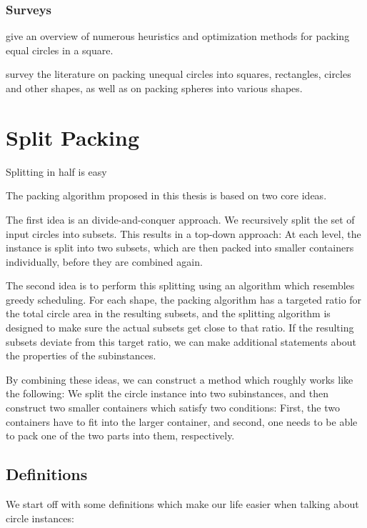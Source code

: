 \documentclass[a4paper,style=print,bibliography=totoc,nexus,lnum,extramargin]{tubsbook}
\begin{document}
\subsection{Surveys}

\textcite{SMCSCG2007new} give an overview of numerous heuristics and optimization methods for packing equal circles in a square.

\textcite{HM2009literature} survey the literature on packing unequal circles into squares, rectangles, circles and other shapes, as well as on packing spheres into various shapes.

\chapter{Split Packing}

Splitting in half is easy

The packing algorithm proposed in this thesis is based on two core ideas.

The first idea is an divide-and-conquer approach. We recursively split the set of input circles into subsets. This results in a top-down approach: At each level, the instance is split into two subsets, which are then packed into smaller containers individually, before they are combined again.

The second idea is to perform this splitting using an algorithm which resembles greedy scheduling. For each shape, the packing algorithm has a targeted ratio for the total circle area in the resulting subsets, and the splitting algorithm is designed to make sure the actual subsets get close to that ratio. If the resulting subsets deviate from this target ratio, we can make additional statements about the properties of the subinstances.

By combining these ideas, we can construct a method which roughly works like the following: We split the circle instance into two subinstances, and then construct two smaller containers which satisfy two conditions: First, the two containers have to fit into the larger container, and second, one needs to be able to pack one of the two parts into them, respectively.

\section{Definitions}

We start off with some definitions which make our life easier when talking about circle instances:
\end{document}

